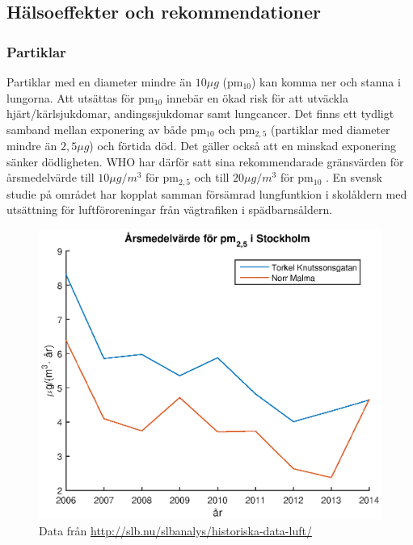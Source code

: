 \subsection{Hälsoeffekter och rekommendationer}
\subsubsection{Partiklar}
Partiklar med en diameter mindre än $10 \mu g$ (pm$_{10}$) kan komma ner och stanna i lungorna. Att utsättas för pm$_{10}$ innebär en ökad risk för att utväckla hjärt/kärlsjukdomar, andingssjukdomar samt lungcancer. Det finns ett tydligt samband mellan exponering av både pm$_{10}$ och pm$_{2,5}$ (partiklar med diameter mindre än $2,5 \mu g$) och förtida död. Det gäller också att en minskad exponering sänker dödligheten. WHO har därför satt sina rekommendarade gränsvärden för årsmedelvärde till $10 \mu g/m^3$ för pm$_{2,5}$ och till $20 \mu g/m^3$ för pm$_{10}$ \cite{whoAir}.
En svensk studie på området har kopplat samman försämrad lungfuntkion i skolåldern med utsättning för luftföroreningar från vägtrafiken i spädbarnsåldern. \cite{lungor}
\begin{figure}[H]
	\centering
	\includegraphics[width=.8\textwidth]{Bilder/pm25sth}
	\caption{Data från \url{http://slb.nu/slbanalys/historiska-data-luft/}}
	\label{fig:pm25sth}
\end{figure}


